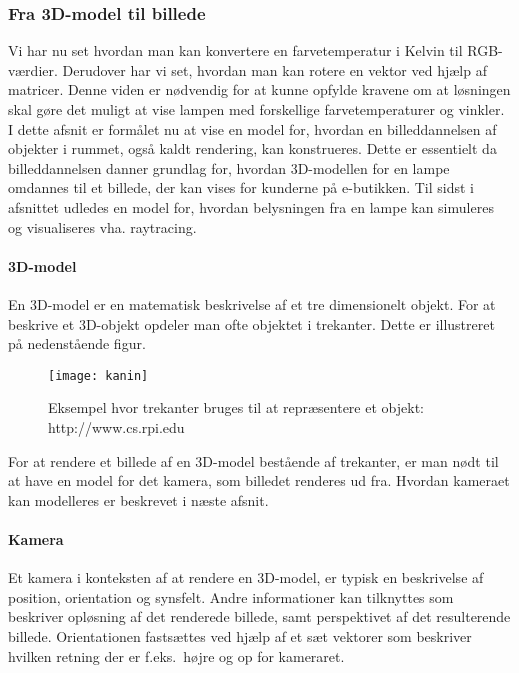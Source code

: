 \subsubsection{Fra 3D-model til billede}
\label{sec:fra_model_til_billede}
Vi har nu set hvordan man kan konvertere en farvetemperatur i Kelvin til RGB-værdier. Derudover har vi set, hvordan man kan rotere en vektor ved hjælp af matricer. Denne viden er nødvendig for at kunne opfylde kravene om at løsningen skal gøre det muligt at vise lampen med forskellige farvetemperaturer og vinkler. I dette afsnit er formålet nu at vise en model for, hvordan en billeddannelsen af objekter i rummet, også kaldt rendering, kan konstrueres. Dette er essentielt da billeddannelsen danner grundlag for, hvordan 3D-modellen for en lampe omdannes til et billede, der kan vises for kunderne på e-butikken. Til sidst i afsnittet udledes en model for, hvordan belysningen fra en lampe kan simuleres og visualiseres vha. raytracing. 

\paragraph{3D-model}
En 3D-model er en matematisk beskrivelse af et tre dimensionelt objekt. For at beskrive et 3D-objekt opdeler man ofte objektet i trekanter. Dette er illustreret på nedenstående figur.

\begin{figure}[H]
\label{fig:kanin}
    \centering
    \texttt{[image: kanin]}
    \caption{Eksempel hvor trekanter bruges til at repræsentere et objekt: http://www.cs.rpi.edu}
\end{figure}

For at rendere et billede af en 3D-model bestående af trekanter, er man nødt til at have en model for det kamera, som billedet renderes ud fra. Hvordan kameraet kan modelleres er beskrevet i næste afsnit.

\paragraph{Kamera}
Et kamera i konteksten af at rendere en 3D-model, er typisk en beskrivelse af position, orientation og synsfelt. Andre informationer kan tilknyttes som beskriver opløsning af det renderede billede, samt perspektivet af det resulterende billede. Orientationen fastsættes ved hjælp af et sæt vektorer som beskriver hvilken retning der er f.eks.\ højre og op for kameraret.

